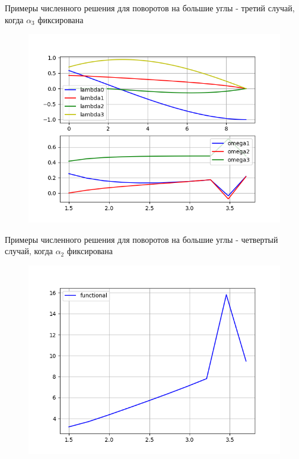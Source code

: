 \documentclass[10pt,utf8,presentation,notheorems,xcolor=dvipsnames,compress]{beamer}
\begin{document}
\begin{frame}{Примеры численного решения для поворотов на большие углы - третий случай, когда $\alpha_3$ фиксирована}
\begin{figure}[H]
\center\includegraphics[scale=0.5]{fig/ivp_and_control_1_5-3_7_50.png}
\caption{}
\end{figure}
\end{frame}

\begin{frame}{Примеры численного решения для поворотов на большие углы - четвертый случай, когда $\alpha_2$ фиксирована}
\begin{figure}[H]
\center\includegraphics[scale=0.5]{fig/functional_1_5-3_7_50.png}
\caption{}
\end{figure}
\end{frame}
\end{document}
